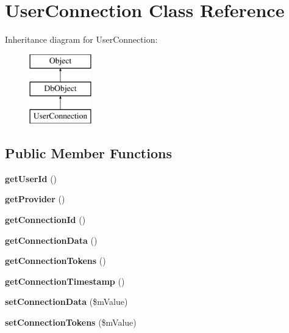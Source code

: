 \hypertarget{class_user_connection}{\section{User\-Connection Class Reference}
\label{class_user_connection}
}
Inheritance diagram for User\-Connection\-:\begin{figure}[H]
\begin{center}
\leavevmode
\includegraphics[height=3.000000cm]{class_user_connection}
\end{center}
\end{figure}
\subsection*{Public Member Functions}
\begin{DoxyCompactItemize}
\item 
\hypertarget{class_user_connection_a4bab4b59784eb0b18f81b1a4e120ced3}{{\bfseries get\-User\-Id} ()}\label{class_user_connection_a4bab4b59784eb0b18f81b1a4e120ced3}

\item 
\hypertarget{class_user_connection_adb6323bc5ec54e4d6b40e690fbf662ac}{{\bfseries get\-Provider} ()}\label{class_user_connection_adb6323bc5ec54e4d6b40e690fbf662ac}

\item 
\hypertarget{class_user_connection_aeb7f7aec0fab5df84ec4a0e107188204}{{\bfseries get\-Connection\-Id} ()}\label{class_user_connection_aeb7f7aec0fab5df84ec4a0e107188204}

\item 
\hypertarget{class_user_connection_a4dcaab2b0cb89386f39fe4e0c7ed9f74}{{\bfseries get\-Connection\-Data} ()}\label{class_user_connection_a4dcaab2b0cb89386f39fe4e0c7ed9f74}

\item 
\hypertarget{class_user_connection_adc0eb0c5aefe81fe39dc13a3fd7cab9e}{{\bfseries get\-Connection\-Tokens} ()}\label{class_user_connection_adc0eb0c5aefe81fe39dc13a3fd7cab9e}

\item 
\hypertarget{class_user_connection_a2d94022e1fecd8ad05807ede0b9f2bb0}{{\bfseries get\-Connection\-Timestamp} ()}\label{class_user_connection_a2d94022e1fecd8ad05807ede0b9f2bb0}

\item 
\hypertarget{class_user_connection_a3b21e732f44cf913661e254754a476b4}{{\bfseries set\-Connection\-Data} (\$m\-Value)}\label{class_user_connection_a3b21e732f44cf913661e254754a476b4}

\item 
\hypertarget{class_user_connection_a9b0058b66a4b119a49407ce21765d31d}{{\bfseries set\-Connection\-Tokens} (\$m\-Value)}\label{class_user_connection_a9b0058b66a4b119a49407ce21765d31d}

\end{DoxyCompactItemize}
